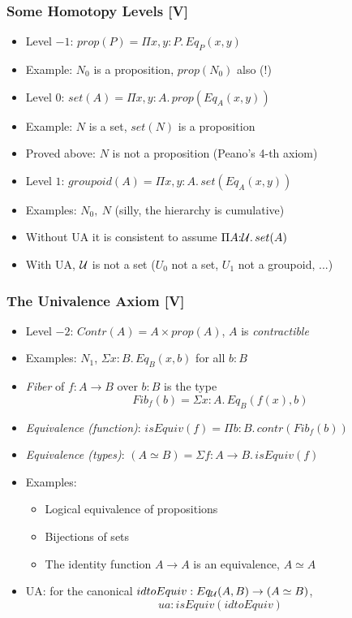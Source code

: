 \documentclass[handout]{beamer}
\newcommand{\depi}[3]{\Pi{#1{:}#2.\,#3}}
\newcommand{\sigm}[3]{\Sigma{#1{:}#2.\,#3}}
\newcommand{\UU}{{\cal U}}
\begin{document}
  
 \frame
  {
  
    \frametitle{Some Homotopy Levels [V]}

    \begin{itemize}[<+->]
    \item Level $-1$: $prop(P) = \depi{x,y}{P}{Eq_P(x,y)}$
    \item Example: $N_0$ is a proposition, $prop(N_0)$ also (!)
    \item Level $0$: $set(A) = \depi{x,y}{A}{prop(Eq_A(x,y))}$
    \item Example: $N$ is a set, $set(N)$ is a proposition
    \item Proved above: $N$ is not a proposition (Peano's 4-th axiom)
    \item Level $1$: $groupoid(A) = \depi{x,y}{A}{set(Eq_A(x,y))}$
    \item Examples: $N_0,~N$ (silly, the hierarchy is cumulative)
    \item Without UA it is consistent to assume $\depi{A}{\UU}{set(A)}$
    \item With UA, $\UU$ is not a set ($U_0$ not a set, $U_1$ not a groupoid, ...)
    \end{itemize}
  }

 \frame
  {
  
    \frametitle{The Univalence Axiom [V]}

    \begin{itemize}[<+->]
    \item Level $-2$: $Contr(A) = A \times prop(A)$, $A$ is \emph{contractible}
    \item Examples: $N_1$, $\sigm{x}{B}{Eq_B(x,b)}$ for all $b:B$
    \item \emph{Fiber} of $f:A\to B$ over $b:B$ is the type
    \[Fib_f (b) = \sigm{x}{A}{Eq_B(f(x),b)}\]
    \item \emph{Equivalence (function)}: $isEquiv(f) = \depi{b}{B}{contr(Fib_f (b))}$
    \item \emph{Equivalence (types)}: 
    $(A\simeq B) = \sigm{f}{A\to B}{isEquiv(f)}$
    \item Examples:
      \begin{itemize}[<+->]
      \item Logical equivalence of propositions
      \item Bijections of sets
      \item The identity function $A\to A$ is an equivalence, $A\simeq A$
      \end{itemize}
    \item UA:  for the canonical $idtoEquiv: Eq_{\UU}(A,B) \to (A\simeq B)$,
                                    \[ua : isEquiv(idtoEquiv)\] 
    \end{itemize}
  }
\end{document}
